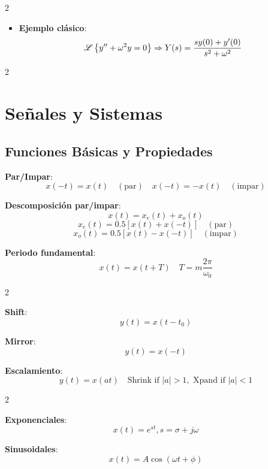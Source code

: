 \documentclass{article}
\begin{document}
\begin{multicols}{2}
\begin{itemize}[leftmargin=*,noitemsep,topsep=0pt]
        \item \textbf{Ejemplo clásico}:
          $$\mathscr{L}\left\{y'' + \omega^2 y = 0\right\} \Rightarrow Y(s) = \dfrac{sy(0) + y'(0)}{s^2 + \omega^2}$$
      \end{itemize}

                        \end{multicols}
\newpage
%
\newpage
\begin{multicols}{2}
\section{Señales y Sistemas}

\subsection*{Funciones Básicas y Propiedades}
\begin{itemform}
\item \textbf{Par/Impar}:
$$x(-t)=x(t) \quad (\text{par}) \quad x(-t)=-x(t) \quad (\text{impar})$$
\item \textbf{Descomposición par/impar}:
$$x(t) = x_e(t) + x_o(t) $$
$$x_e(t)=0.5[x(t)+x(-t)] \quad (\text{par}) $$
$$x_o(t)=0.5[x(t)-x(-t)] \quad (\text{impar})$$
\item \textbf{Periodo fundamental}:
$$x(t)=x(t+T) \quad T=m\frac{2\pi}{\omega_0} $$
\end{itemform}

\begin{itemform}
\begin{multicols}{2}
\item \textbf{Shift}:
$$y(t) = x(t - t_0) $$

\columnbreak
\item \textbf{Mirror}:
$$y(t) = x(-t) $$
\end{multicols}
\item \textbf{Escalamiento}:
$$y(t) = x(at) \quad \text{Shrink if } |a| > 1, \text{ Xpand if } |a| < 1$$
\end{itemform}

\begin{multicols}{2}
\begin{itemform}
\item \textbf{Exponenciales}:
$$x(t) = e^{st}, s = \sigma + j\omega $$

\columnbreak
\item \textbf{Sinusoidales}:
$$x(t) = A\cos(\omega t + \phi) $$
\end{itemform}
  

\end{multicols}
\end{multicols}
\end{document}
